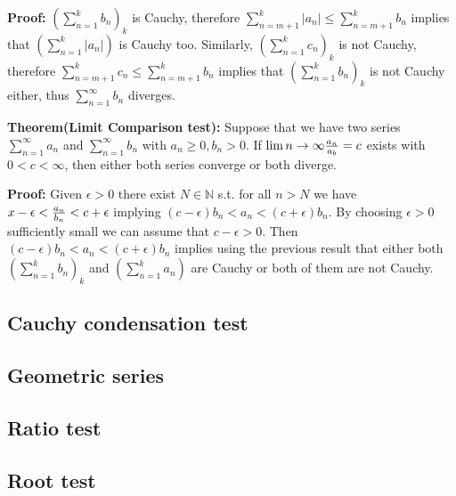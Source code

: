\documentclass{article}
\begin{document}
\textbf{Proof:} $(\sum_{n=1}^{k}{b_n})_k$ is Cauchy, therefore $\sum_{n=m+1}^{k}{|a_n|}\leq \sum_{n=m+1}^{k}{b_n}$ implies that $(\sum_{n=1}^{k}{|a_n|})$ is Cauchy too. 
Similarly, $(\sum_{n=1}^{k}{c_n})_k$ is not Cauchy, therefore $\sum_{n=m+1}^{k}{c_n}\leq \sum_{n=m+1}^{k}{b_n}$ implies that $(\sum_{n=1}^{k}{b_n})_k$ is not Cauchy either, thus $\sum_{n=1}^{\infty}{b_n}$ diverges.

\textbf{Theorem(Limit Comparison test):} Suppose that we have two series $\sum_{n=1}^{\infty}{a_n}$ and $\sum_{n=1}^{\infty}{b_n}$ with $a_n\geq 0, b_n > 0$. If $\lim{n\to \infty}{a_n\over a_b}=c$ exists with $0<c<\infty$, then either both series converge or both diverge.

\textbf{Proof:} Given $\epsilon > 0$ there exist $N\in \mathbb{N}$ s.t. for all $n>N$ we have $x-\epsilon <{a_n\over b_n} < c + \epsilon$ implying $(c-\epsilon)b_n<a_n<(c+\epsilon)b_n$. By choosing $\epsilon>0$ sufficiently small we can assume that $c-\epsilon >0$. Then $(c-\epsilon)b_n<a_n<(c+\epsilon)b_n$ implies using the previous result that either both $(\sum_{n=1}^{k}{b_n})_k$ and $(\sum_{n=1}^{k}{a_n})$ are Cauchy or both of them are not Cauchy.


\subsection{Cauchy condensation test}
\subsection{Geometric series}
\subsection{Ratio test}
\subsection{Root test}
\end{document}
